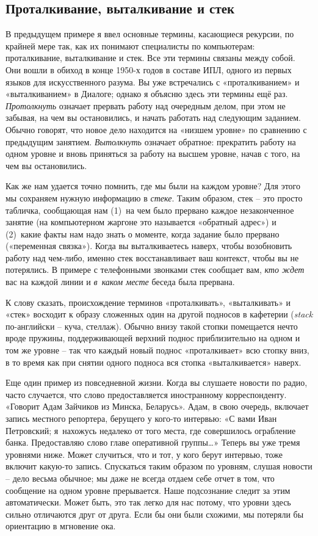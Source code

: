 \documentclass[../main.tex]{subfiles}
\begin{document}
\subsection{Проталкивание, выталкивание и стек}

В предыдущем примере я ввел основные термины, касающиеся рекурсии, по крайней мере так, как их понимают специалисты по компьютерам: проталкивание, выталкивание и стек. Все эти термины связаны между собой. Они вошли в обиход в конце 1950-х годов в составе ИПЛ, одного из первых языков для искусственного разума. Вы уже встречались с «проталкиванием» и «выталкиванием» в Диалоге; однако я объясню здесь эти термины ещё раз. \emph{Протолкнуть} означает прервать работу над очередным делом, при этом не забывая, на чем вы остановились, и начать работать над следующим заданием. Обычно говорят, что новое дело находится на «низшем уровне» по сравнению с предыдущим занятием. \emph{Вытолкнуть} означает обратное: прекратить работу на одном уровне и вновь приняться за работу на высшем уровне, начав с того, на чем вы остановились.

Как же нам удается точно помнить, где мы были на каждом уровне? Для этого мы сохраняем нужную информацию в \emph{стеке}. Таким образом, стек \--- это просто табличка, сообщающая нам (1)~на чем было прервано каждое незаконченное занятие (на компьютерном жаргоне это называется «обратный адрес») и (2)~какие факты нам надо знать о моменте, когда задание было прервано («переменная связка»). Когда вы выталкиваетесь наверх, чтобы возобновить работу над чем-либо, именно стек восстанавливает ваш контекст, чтобы вы не потерялись. В примере с телефонными звонками стек сообщает вам, \emph{кто ждет} вас на каждой линии и \emph{в~каком месте} беседа была прервана.

К слову сказать, происхождение терминов «проталкивать», «выталкивать» и «стек» восходит к образу сложенных один на другой подносов в кафетерии (\emph{stack} по-английски \--- куча, стеллаж). Обычно внизу такой стопки помещается нечто вроде пружины, поддерживающей верхний поднос приблизительно на одном и том же уровне \--- так что каждый новый поднос «проталкивает» всю стопку вниз, в то время как при снятии одного подноса вся стопка «выталкивается» наверх.

Еще один пример из повседневной жизни. Когда вы слушаете новости по радио, часто случается, что слово предоставляется иностранному корреспонденту. «Говорит Адам Зайчиков из Минска, Беларусь». Адам, в свою очередь, включает запись местного репортера, берущего у кого-то интервью: «С вами Иван Петровский; я~нахожусь недалеко от того места, где совершилось ограбление банка. Предоставляю слово главе оперативной группы\ldots» Теперь вы уже тремя уровнями ниже. Может случиться, что и тот, у кого берут интервью, тоже включит какую-то запись. Спускаться таким образом по уровням, слушая новости \--- дело весьма обычное; мы даже не всегда отдаем себе отчет в том, что сообщение на одном уровне прерывается. Наше подсознание следит за этим автоматически. Может быть, это так легко для нас потому, что уровни здесь сильно отличаются друг от друга. Если бы они были схожими, мы потеряли бы ориентацию в мгновение ока.
\end{document}
